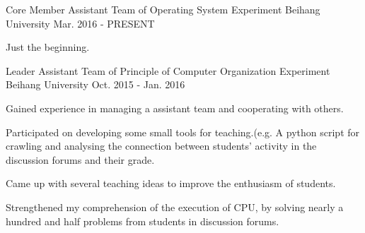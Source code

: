 


\begin{cventries}


\cventry
{Core Member} %
{Assistant Team of Operating System Experiment} %
{Beihang University} %
{Mar. 2016 - PRESENT} %
{ %
\begin{cvitems}
	\item {Just the beginning.}
\end{cvitems}
}



\cventry
{Leader} %
{Assistant Team of Principle of Computer Organization Experiment} %
{Beihang University} %
{Oct. 2015 - Jan. 2016} %
{ %
\begin{cvitems}
\item {Gained experience in managing a assistant team and cooperating with others.}
\item {Participated on developing some small tools for teaching.(e.g. A python script for crawling and analysing the connection between students' activity in the discussion forums and their grade.}
\item {Came up with several teaching ideas to improve the enthusiasm of students.}
\item {Strengthened my comprehension of the execution of CPU, by solving nearly a hundred and half problems from students in discussion forums.}
\end{cvitems}
}


%

\end{cventries}